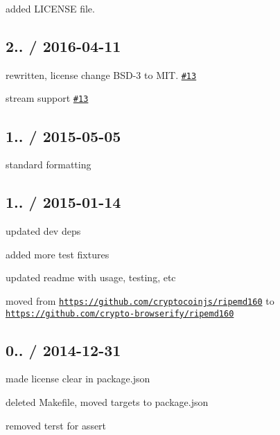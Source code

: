 
\begin{DoxyItemize}
\item added L\+I\+C\+E\+N\+SE file.
\end{DoxyItemize}

\subsection*{2.. / 2016-\/04-\/11 }


\begin{DoxyItemize}
\item rewritten, license change B\+S\+D-\/3 to M\+IT. \href{https://github.com/crypto-browserify/ripemd160/pull/13}{\tt \#13}
\item stream support \href{https://github.com/crypto-browserify/ripemd160/pull/13}{\tt \#13}
\end{DoxyItemize}

\subsection*{1.. / 2015-\/05-\/05 }


\begin{DoxyItemize}
\item standard formatting
\end{DoxyItemize}

\subsection*{1.. / 2015-\/01-\/14 }


\begin{DoxyItemize}
\item updated dev deps
\item added more test fixtures
\item updated readme with usage, testing, etc
\item moved from \href{https://github.com/cryptocoinjs/ripemd160}{\tt https\+://github.\+com/cryptocoinjs/ripemd160} to \href{https://github.com/crypto-browserify/ripemd160}{\tt https\+://github.\+com/crypto-\/browserify/ripemd160}
\end{DoxyItemize}

\subsection*{0.. / 2014-\/12-\/31 }


\begin{DoxyItemize}
\item made license clear in {\ttfamily package.\+json}
\item deleted {\ttfamily Makefile}, moved targets to {\ttfamily package.\+json}
\item removed {\ttfamily terst} for {\ttfamily assert}
\end{DoxyItemize}

